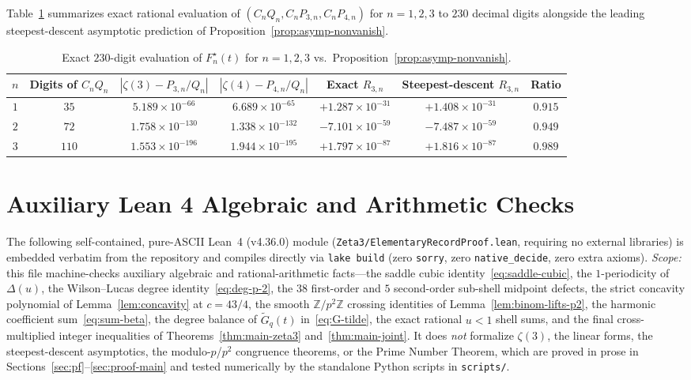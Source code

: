 \documentclass[11pt,reqno]{amsart}
\theoremstyle{definition}
\theoremstyle{remark}
\newcommand{\ZZ}{\mathbb{Z}}
\begin{document}
Table~\ref{tab:small-n} summarizes exact rational evaluation of $(C_n Q_n, C_n P_{3,n}, C_n P_{4,n})$ for $n = 1, 2, 3$ to $230$ decimal digits alongside the leading steepest-descent asymptotic prediction of Proposition~\ref{prop:asymp-nonvanish}.

\begin{table}[ht]
\centering
\caption{Exact $230$-digit evaluation of $F_n^{\star}(t)$ for $n = 1, 2, 3$ vs.\ Proposition~\ref{prop:asymp-nonvanish}.}
\label{tab:small-n}
\footnotesize
\renewcommand{\arraystretch}{1.22}
\setlength{\tabcolsep}{5pt}
\begin{tabular}{@{}ccccccc@{}}
\toprule
$n$ & Digits of $C_n Q_n$ & $|\zeta(3) - P_{3,n}/Q_n|$ & $|\zeta(4) - P_{4,n}/Q_n|$ & Exact $R_{3,n}$ & Steepest-descent $R_{3,n}$ & Ratio \\
\midrule
$1$ & $35$  & $5.189 \times 10^{-66}$  & $6.689 \times 10^{-65}$  & $+1.287 \times 10^{-31}$ & $+1.408 \times 10^{-31}$ & $0.915$ \\
$2$ & $72$  & $1.758 \times 10^{-130}$ & $1.338 \times 10^{-132}$ & $-7.101 \times 10^{-59}$ & $-7.487 \times 10^{-59}$ & $0.949$ \\
$3$ & $110$ & $1.553 \times 10^{-196}$ & $1.944 \times 10^{-195}$ & $+1.797 \times 10^{-87}$ & $+1.816 \times 10^{-87}$ & $0.989$ \\
\bottomrule
\end{tabular}
\end{table}

\clearpage
\section{Auxiliary Lean 4 Algebraic and Arithmetic Checks}
\label{app:lean}

The following self-contained, pure-ASCII Lean~4 (v4.36.0) module (\texttt{Zeta3/\allowbreak Elementary\allowbreak Record\allowbreak Proof.lean}, requiring no external libraries) is embedded verbatim from the repository and compiles directly via \texttt{lake build} (zero \texttt{sorry}, zero \texttt{native\_\allowbreak decide}, zero extra axioms). \emph{Scope:} this file machine-checks auxiliary algebraic and rational-arithmetic facts—the saddle cubic identity~\eqref{eq:saddle-cubic}, the $1$-periodicity of $\Delta(u)$, the Wilson--Lucas degree identity~\eqref{eq:deg-p-2}, the $38$ first-order and $5$ second-order sub-shell midpoint defects, the strict concavity polynomial of Lemma~\ref{lem:concavity} at $c = 43/4$, the smooth $\ZZ/p^2\ZZ$ crossing identities of Lemma~\ref{lem:binom-lifts-p2}, the harmonic coefficient sum~\eqref{eq:sum-beta}, the degree balance of $\widetilde{G}_q(t)$ in~\eqref{eq:G-tilde}, the exact rational $u < 1$ shell sums, and the final cross-multiplied integer inequalities of Theorems~\ref{thm:main-zeta3} and~\ref{thm:main-joint}. It does \emph{not} formalize $\zeta(3)$, the linear forms, the steepest-descent asymptotics, the modulo-$p$/$p^2$ congruence theorems, or the Prime Number Theorem, which are proved in prose in Sections~\ref{sec:pf}--\ref{sec:proof-main} and tested numerically by the standalone Python scripts in \texttt{scripts/}.

\begingroup\raggedbottom

\endgroup

\clearpage


\end{document}

